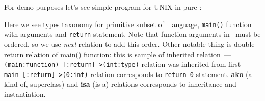 
For demo purposes let’s see simple program for UNIX in pure \C{}:



Here we see types taxonomy for primitive subset of \C{}\ language, \verb|main()|
function with arguments and \verb|return| statement. Note that function
arguments in \C\ must be ordered, so we use \emph{next} relation to add this
order. Other notable thing is double return relation of main() function: this is
sample of inherited relation\ --- \verb|(main:function)-[:return]->(int:type)|
relation was inherited from first \verb|main-[:return]->(0:int)| relation
corresponds to \verb|return 0| statement. \textbf{ako} (a-kind-of, superclass)
and \textbf{isa} (is-a) relations corresponds to inheritance and instantiation.
